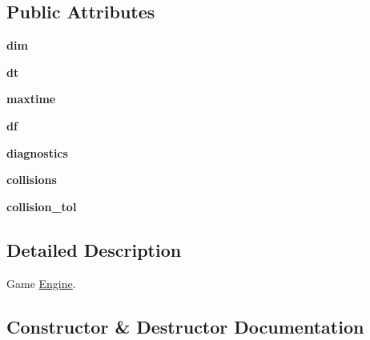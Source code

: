 \subsection*{Public Attributes}
\begin{DoxyCompactItemize}
\item 
\mbox{\label{class_d_o_t__assignment_1_1engine_1_1_engine_ab691fb9c0c5832cb6d25f5ee6fc214c3}} 
{\bfseries dim}
\item 
\mbox{\label{class_d_o_t__assignment_1_1engine_1_1_engine_ab0baafb52c15b816e70c4a0d36d68b64}} 
{\bfseries dt}
\item 
\mbox{\label{class_d_o_t__assignment_1_1engine_1_1_engine_ab084eb559db7b143682a358163345ab7}} 
{\bfseries maxtime}
\item 
\mbox{\label{class_d_o_t__assignment_1_1engine_1_1_engine_a9110744915ac317d1f58a2303605bef7}} 
{\bfseries df}
\item 
\mbox{\label{class_d_o_t__assignment_1_1engine_1_1_engine_abf7d1d85bda9cf9e195b3ed991b03582}} 
{\bfseries diagnostics}
\item 
\mbox{\label{class_d_o_t__assignment_1_1engine_1_1_engine_abfb753eb2a6f0aa3dcf6bee61bea1fb6}} 
{\bfseries collisions}
\item 
\mbox{\label{class_d_o_t__assignment_1_1engine_1_1_engine_a30cdf16dbd7d6de134b75ce33f8bb987}} 
{\bfseries collision\+\_\+tol}
\end{DoxyCompactItemize}


\subsection{Detailed Description}
Game \mbox{\hyperlink{class_d_o_t__assignment_1_1engine_1_1_engine}{Engine}}. 

\subsection{Constructor \& Destructor Documentation}
\mbox{\label{class_d_o_t__assignment_1_1engine_1_1_engine_a015280d12f0cd3f5bf517dd662383474}} 
